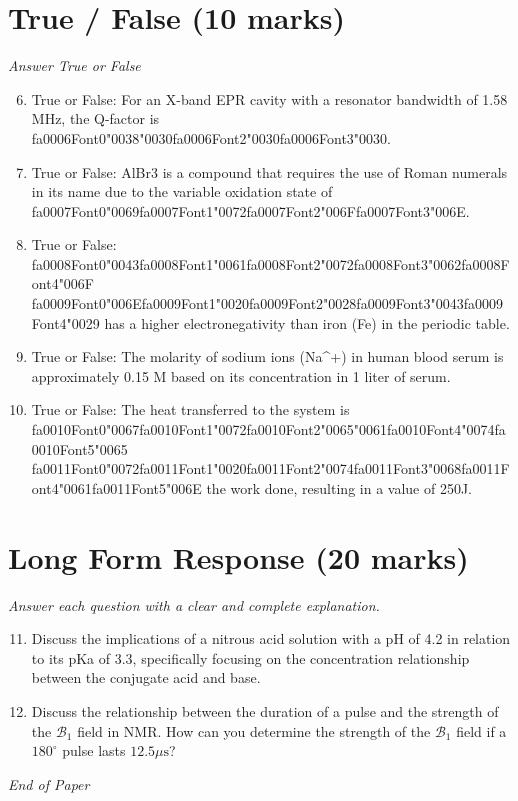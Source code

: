 \documentclass[12pt]{article}
\begin{document}
\section*{True / False (10 marks)}
\textit{Answer True or False}
\begin{enumerate}[label=\arabic*.]
\setcounter{enumi}{5}
\item True or False: For an X-band EPR cavity with a resonator bandwidth of 1.58 MHz, the Q-factor is {\csname fa0006Font0\endcsname\char"0038}{\char"0030}{\csname fa0006Font2\endcsname\char"0030}{\csname fa0006Font3\endcsname\char"0030}.
\item True or False: AlBr3 is a compound that requires the use of Roman numerals in its name due to the variable oxidation state of {\csname fa0007Font0\endcsname\char"0069}{\csname fa0007Font1\endcsname\char"0072}{\csname fa0007Font2\endcsname\char"006F}{\csname fa0007Font3\endcsname\char"006E}.
\item True or False: {\csname fa0008Font0\endcsname\char"0043}{\csname fa0008Font1\endcsname\char"0061}{\csname fa0008Font2\endcsname\char"0072}{\csname fa0008Font3\endcsname\char"0062}{\csname fa0008Font4\endcsname\char"006F} {\csname fa0009Font0\endcsname\char"006E}{\csname fa0009Font1\endcsname\char"0020}{\csname fa0009Font2\endcsname\char"0028}{\csname fa0009Font3\endcsname\char"0043}{\csname fa0009Font4\endcsname\char"0029} has a higher electronegativity than iron (Fe) in the periodic table.
\item True or False: The molarity of sodium ions (Na\^{}+) in human blood serum is approximately 0.15 M based on its concentration in 1 liter of serum.
\item True or False: The heat transferred to the system is {\csname fa0010Font0\endcsname\char"0067}{\csname fa0010Font1\endcsname\char"0072}{\csname fa0010Font2\endcsname\char"0065}{\char"0061}{\csname fa0010Font4\endcsname\char"0074}{\csname fa0010Font5\endcsname\char"0065} {\csname fa0011Font0\endcsname\char"0072}{\csname fa0011Font1\endcsname\char"0020}{\csname fa0011Font2\endcsname\char"0074}{\csname fa0011Font3\endcsname\char"0068}{\csname fa0011Font4\endcsname\char"0061}{\csname fa0011Font5\endcsname\char"006E} the work done, resulting in a value of 250J.
\end{enumerate}

\section*{Long Form Response (20 marks)}
\textit{Answer each question with a clear and complete explanation.}
\begin{enumerate}[label=\arabic*.]
\setcounter{enumi}{10}
\item Discuss the implications of a nitrous acid solution with a pH of 4.2 in relation to its
pKa of 3.3, specifically focusing on the concentration relationship between the conjugate
acid and base.
\item Discuss the relationship between the duration of a pulse and the strength of the
$\mathscr{B}_1$ field in NMR. How can you determine the strength of the $\mathscr{B}_1$
field if a $180^{\circ}$ pulse lasts $12.5 \mu \mathrm{s}$?
\end{enumerate}

\vfill
\noindent\textit{End of Paper}
\end{document}
